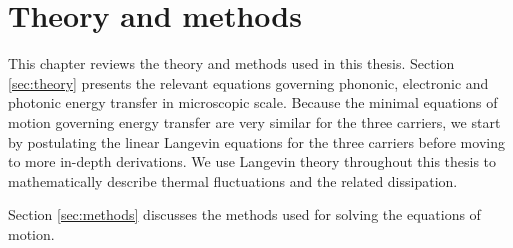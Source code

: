 \chapter{Theory and methods}
\label{chap:theory}

This chapter reviews the theory and methods used in this thesis. Section \ref{sec:theory} presents the relevant equations governing phononic, electronic and photonic energy transfer in microscopic scale. Because the minimal equations of motion governing energy transfer are very similar for the three carriers, we start by postulating the linear Langevin equations for the three carriers before moving to more in-depth derivations. We use Langevin theory \cite{langevin08} throughout this thesis to mathematically describe thermal fluctuations and the related dissipation. %


Section \ref{sec:methods} discusses the methods used for solving the equations of motion. 

 
